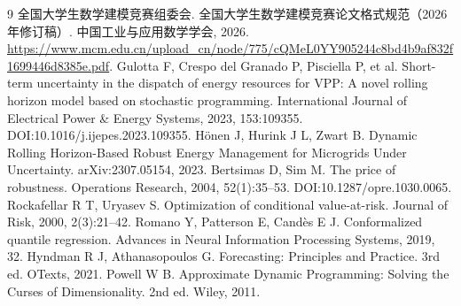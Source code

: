 \documentclass[UTF8,12pt,a4paper]{ctexart}
\begin{document}
\begin{thebibliography}{9}
 全国大学生数学建模竞赛组委会. 全国大学生数学建模竞赛论文格式规范（2026年修订稿）. 中国工业与应用数学学会, 2026. \url{https://www.mcm.edu.cn/upload_cn/node/775/cQMeL0YY905244c8bd4b9af832f1699446d8385e.pdf}.
 Gulotta F, Crespo del Granado P, Pisciella P, et al. Short-term uncertainty in the dispatch of energy resources for VPP: A novel rolling horizon model based on stochastic programming. International Journal of Electrical Power \& Energy Systems, 2023, 153:109355. DOI:10.1016/j.ijepes.2023.109355.
 Hönen J, Hurink J L, Zwart B. Dynamic Rolling Horizon-Based Robust Energy Management for Microgrids Under Uncertainty. arXiv:2307.05154, 2023.
 Bertsimas D, Sim M. The price of robustness. Operations Research, 2004, 52(1):35--53. DOI:10.1287/opre.1030.0065.
 Rockafellar R T, Uryasev S. Optimization of conditional value-at-risk. Journal of Risk, 2000, 2(3):21--42.
 Romano Y, Patterson E, Candès E J. Conformalized quantile regression. Advances in Neural Information Processing Systems, 2019, 32.
 Hyndman R J, Athanasopoulos G. Forecasting: Principles and Practice. 3rd ed. OTexts, 2021.
 Powell W B. Approximate Dynamic Programming: Solving the Curses of Dimensionality. 2nd ed. Wiley, 2011.
\end{thebibliography}


\appendix
\end{document}
